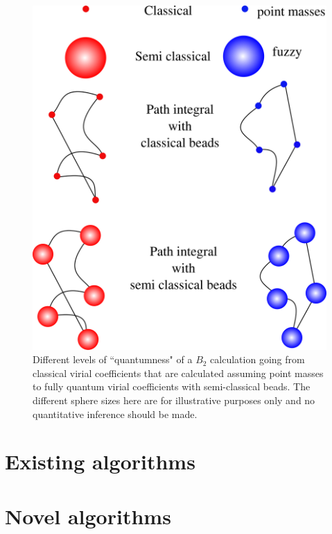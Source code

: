             \begin{figure}
                \centering
                \includegraphics[scale=0.087,keepaspectratio]{Chapter-2/Figures/quantumLevels.png}
                \caption{Different levels of ``quantumness" of a $B_2$ calculation going from classical virial coefficients that are calculated assuming point masses to fully quantum virial coefficients with semi-classical beads. The different sphere sizes here are for illustrative purposes only and no quantitative inference should be made.} \label{quantumness}
            \end{figure}
\section{Existing algorithms}
\section{Novel algorithms}\label{sec:novel algorithms}
